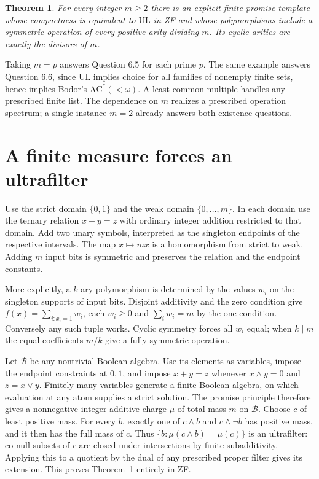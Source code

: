 \documentclass[11pt]{article}
\newtheorem{theorem}{Theorem}
\newcommand{\UL}{\mathrm{UL}}
\begin{document}
\begin{theorem}\label{mass}
For every integer $m\geq2$ there is an explicit finite promise template whose compactness is equivalent to $\UL$ in ZF and whose polymorphisms include a symmetric operation of every positive arity dividing $m$. Its cyclic arities are exactly the divisors of $m$.
\end{theorem}
Taking $m=p$ answers Question 6.5 for each prime $p$. The same example answers Question 6.6, since $\UL$ implies choice for all families of nonempty finite sets, hence implies Bodor's $\mathrm{AC}^*(<\omega)$. A least common multiple handles any prescribed finite list. The dependence on $m$ realizes a prescribed operation spectrum; a single instance $m=2$ already answers both existence questions.

\section{A finite measure forces an ultrafilter}
Use the strict domain $\{0,1\}$ and the weak domain $\{0,\ldots,m\}$. In each domain use the ternary relation $x+y=z$ with ordinary integer addition restricted to that domain. Add two unary symbols, interpreted as the singleton endpoints of the respective intervals. The map $x\mapsto mx$ is a homomorphism from strict to weak. Adding $m$ input bits is symmetric and preserves the relation and the endpoint constants.

More explicitly, a $k$-ary polymorphism is determined by the values $w_i$ on the singleton supports of input bits. Disjoint additivity and the zero condition give $f(x)=\sum_{i:x_i=1}w_i$, each $w_i\geq0$ and $\sum_iw_i=m$ by the one condition. Conversely any such tuple works. Cyclic symmetry forces all $w_i$ equal; when $k\mid m$ the equal coefficients $m/k$ give a fully symmetric operation.

Let $\mathcal B$ be any nontrivial Boolean algebra. Use its elements as variables, impose the endpoint constraints at $0,1$, and impose $x+y=z$ whenever $x\wedge y=0$ and $z=x\vee y$. Finitely many variables generate a finite Boolean algebra, on which evaluation at any atom supplies a strict solution. The promise principle therefore gives a nonnegative integer additive charge $\mu$ of total mass $m$ on $\mathcal B$. Choose $c$ of least positive mass. For every $b$, exactly one of $c\wedge b$ and $c\wedge\neg b$ has positive mass, and it then has the full mass of $c$. Thus $\{b:\mu(c\wedge b)=\mu(c)\}$ is an ultrafilter: co-null subsets of $c$ are closed under intersections by finite subadditivity. Applying this to a quotient by the dual of any prescribed proper filter gives its extension. This proves Theorem~\ref{mass} entirely in ZF.
\end{document}
